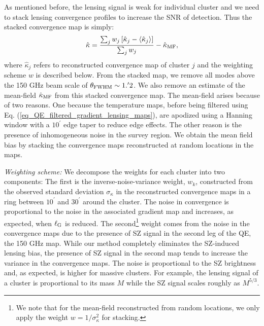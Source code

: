As mentioned before, the lensing signal is weak for individual cluster and we need to stack lensing convergence profiles to increase the SNR of detection.
 Thus the stacked convergence map is simply: 
 \begin{equation}
 \hat{\kappa} = \frac{\sum_j  w_j \left[ \hat{\kappa}_{j} - \left< \hat{\kappa}_{j} \right> \right]}{\sum_j w_j} - \hat{\kappa}_{\rm MF},
 \end{equation}
 where $\hat{\kappa}_{j}$ refers to reconstructed convergence map of cluster $j$ %
 and the weighting scheme $w$ is described below.
From the stacked map, we remove all modes above the \sptpol{} 150 GHz beam scale of $\theta_{\rm FWHM}\sim 1.^{\prime}2$. 
We also remove an estimate of the mean-field $\hat{\kappa}_{\rm MF}$ from this stacked convergence map.
The mean-field arises because of two reasons.
One because the temperature maps, before being filtered using Eq. (\ref{eq_QE_filtered_gradient_lensing_maps}), are apodized using a Hanning window with a $10^{\prime}$ edge taper to reduce edge effects.
The other reason is the presence of inhomogeneous noise in the survey region.
We obtain the mean field bias by stacking the convergence maps reconstructed at \howmanyrandomsforMF{} random locations in the maps. 


{\it Weighting scheme:} We decompose the weights for each cluster into two components: 
The first is the inverse-noise-variance weight, $w_{k}$, constructed from the observed standard deviation $\sigma_{\kappa}$ in the reconstructed \sptpol{} convergence maps in a ring between $10^{\prime}$ and $30^{\prime}$ around the cluster. 
The noise in convergence is proportional to the noise in the associated gradient map and increases, as expected, when $\ell_{\rm G}$ is reduced.
The second\footnote{We note that for the mean-field reconstructed from random locations, we only apply the weight $w = 1/\sigma_{\kappa}^2$ for stacking.} weight comes from the noise in the convergence maps due to the presence of SZ signal in the second leg of the QE, the \sptpol{} 150 GHz map.
While our method completely eliminates the SZ-induced lensing bias, the presence of SZ signal in the second map tends to increase the variance in the convergence maps. 
The noise is proportional to the SZ brightness and, as expected, is higher for massive clusters.
For example, the lensing signal of a cluster is proportional to its mass $M$ while the SZ signal scales roughly as $M^{5/3}$.


